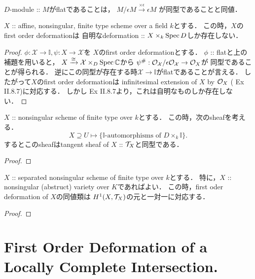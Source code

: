 \documentclass[a4paper]{jsarticle}
\newcommand{\dualnum}{\mathbb{I}}
\newcommand{\famX}{\mathcal{X}}
\begin{document}
    \begin{Lemma}
        $D$-module :: $M$がflatであることは，
        $M/\epsilon M \xrightarrow{\times \epsilon} \epsilon M$
        が同型であることと同値．
    \end{Lemma}

    \begin{Lemma}
        $X$ :: affine, nonsingular, finite type scheme over a field $k$とする．
        この時，$X$のfirst order deformationは
        自明なdeformation :: $X \times_k \operatorname{Spec} D$しか存在しない．
    \end{Lemma}
    \begin{proof}
        $\phi: \famX \to \dualnum, \psi: X \to \famX$を
        $X$のfirst order deformationとする．
        $\phi$ :: flatと上の補題を用いると，
        $X \isomap \famX \times_{D} \Spec \C$から
        $\psi^{\#}: \shO_{\famX}/\epsilon \shO_{\famX} \to \shO_X$が
        同型であることが得られる．
        逆にこの同型が存在する時$\famX \to \dualnum$がflatであることが言える．
        したがって$X$のfirst order deformationは
        infinitesimal extension of $X$ by $\mathcal{O}_X$ (\cite{HarAG} Ex II.8.7)に対応する．
        しかし\cite{HarAG} Ex II.8.7より，これは自明なものしか存在しない．
    \end{proof}

    \begin{Lemma}
        $X$ :: nonsingular scheme of finite type over $k$とする．
        この時，次のsheafを考える．
        \[ X \supseteq U \mapsto \{ \text{$\dualnum$-automorphisms of $D \times_k \dualnum$} \}. \]
        するとこのsheafはtangent sheaf of $X$ :: $\mathcal{T}_X$と同型である．
    \end{Lemma}
    \begin{proof}
    \end{proof}

    \begin{Thm}
        $X$ :: separated nonsingular scheme of finite type over $k$とする．
        特に，$X$ :: nonsingular (abstruct) variety over $K$であればよい．
        この時，first oder deformation of $X$の同値類は
        $H^1(X, \mathcal{T}_X)$の元と一対一に対応する．
    \end{Thm}
    \begin{proof}
    \end{proof}

\section{First Order Deformation of a Locally Complete Intersection.}
\end{document}
